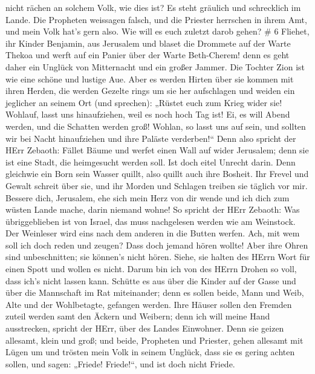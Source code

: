 nicht rächen an solchem Volk, wie dies ist?  Es steht
gräulich und schrecklich im Lande.  Die Propheten weissagen
falsch, und die Priester herrschen in ihrem Amt, und mein Volk hat's
gern also. Wie will es euch zuletzt darob gehen? \# 6 
Fliehet, ihr Kinder Benjamin, aus Jerusalem und blaset die Drommete auf
der Warte Thekoa und werft auf ein Panier über der Warte Beth-Cherem!
denn es geht daher ein Unglück von Mitternacht und ein großer Jammer.
 Die Tochter Zion ist wie eine schöne und lustige Aue.
 Aber es werden Hirten über sie kommen mit ihren Herden, die
werden Gezelte rings um sie her aufschlagen und weiden ein jeglicher an
seinem Ort (und sprechen):  „Rüstet euch zum Krieg wider
sie! Wohlauf, lasst uns hinaufziehen, weil es noch hoch Tag ist! Ei, es
will Abend werden, und die Schatten werden groß!  Wohlan, so
lasst uns auf sein, und sollten wir bei Nacht hinaufziehen und ihre
Paläste verderben!{}``  Denn also spricht der HErr Zebaoth:
Fället Bäume und werfet einen Wall auf wider Jerusalem; denn sie ist
eine Stadt, die heimgesucht werden soll. Ist doch eitel Unrecht darin.
 Denn gleichwie ein Born sein Wasser quillt, also quillt
auch ihre Bosheit. Ihr Frevel und Gewalt schreit über sie, und ihr
Morden und Schlagen treiben sie täglich vor mir.  Bessere
dich, Jerusalem, ehe sich mein Herz von dir wende und ich dich zum
wüsten Lande mache, darin niemand wohne!  So spricht der
HErr Zebaoth: Was übriggeblieben ist von Israel, das muss nachgelesen
werden wie am Weinstock. Der Weinleser wird eins nach dem anderen in die
Butten werfen.  Ach, mit wem soll ich doch reden und
zeugen? Dass doch jemand hören wollte! Aber ihre Ohren sind
unbeschnitten; sie können's nicht hören. Siehe, sie halten des HErrn
Wort für einen Spott und wollen es nicht.  Darum bin ich
von des HErrn Drohen so voll, dass ich's nicht lassen kann. Schütte es
aus über die Kinder auf der Gasse und über die Mannschaft im Rat
miteinander; denn es sollen beide, Mann und Weib, Alte und der
Wohlbetagte, gefangen werden.  Ihre Häuser sollen den
Fremden zuteil werden samt den Äckern und Weibern; denn ich will meine
Hand ausstrecken, spricht der HErr, über des Landes Einwohner.
 Denn sie geizen allesamt, klein und groß; und beide,
Propheten und Priester, gehen allesamt mit Lügen um  und
trösten mein Volk in seinem Unglück, dass sie es gering achten sollen,
und sagen: „Friede! Friede!{}``, und ist doch nicht Friede.
